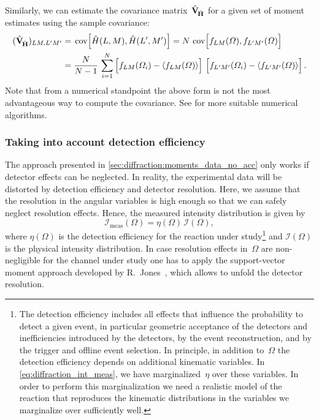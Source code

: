 Similarly, we can estimate the covariance
matrix~$\hat{\bm{\mathrm{V}}}_{\!\hat{\bm{\mathrm{H}}}}$ for a given set of moment
estimates using the sample covariance:
\begin{align}
  (\hat{\covMatSym}_{\!\hat{\vect{H}}})_{L M, L' M'}
  ={}& \cov[2]{\hat{H}(L, M), \hat{H}(L', M')}
  = N\, \cov[2]{f_{L M}(\Omega), f_{L' M'}(\Omega)} \notag
  \\
  \label{eq:diffraction_sample_cov}
  ={}& \frac{N}{N - 1}\, \sum_{i = 1}^N \sBrk[2]{f_{L M}(\Omega_i) - \mean{f_{L M}(\Omega)}}\, \sBrk[2]{f_{L' M'}(\Omega_i) - \mean{f_{L' M'}(\Omega)}}.
\end{align}
Note that from a numerical standpoint the above form is not the most
advantageous way to compute the covariance.  See
 for more suitable numerical
algorithms.


\subsubsection{Taking into account detection efficiency}%
\label{sec:diffraction:acceptance_corr}

The approach presented in \cref{sec:diffraction:moments_data_no_acc}
only works if detector effects can be neglected.  In reality, the
experimental data will be distorted by detection efficiency and
detector resolution.  Here, we assume that the resolution in the
angular variables is high enough so that we can safely neglect
resolution effects.  Hence, the measured intensity distribution is
given by
\begin{equation}
  \label{eq:diffraction_int_meas}
  \mathcal{I}_\text{meas}(\Omega)
  = \eta(\Omega)\, \mathcal{I}(\Omega),
\end{equation}
where $\eta(\Omega)$ is the detection efficiency for the reaction
under study\footnote{The detection efficiency includes all effects
that influence the probability to detect a given event, in particular
geometric acceptance of the detectors and inefficiencies introduced by
the detectors, by the event reconstruction, and by the trigger and
offline event selection.  In principle, in addition to~$\Omega$ the
detection efficiency depends on additional kinematic variables.  In
\cref{eq:diffraction_int_meas}, we have marginalized~$\eta$ over these
variables.  In order to perform this marginalization we need a
realistic model of the reaction that reproduces the kinematic
distributions in the variables we marginalize over sufficiently well.}
and $\mathcal{I}(\Omega)$ is the physical intensity distribution.  In case
resolution effects in~$\Omega$ are non-negligible for the channel
under study one has to apply the support-vector moment approach
developed by R.~Jones~\cite{Jones:2023}, which allows to unfold the
detector resolution.

